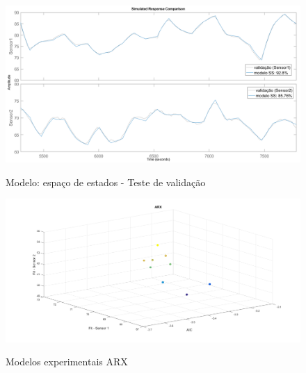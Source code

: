 \begin{apendicesenv}
\begin{figure}
	\caption{Modelo: espaço de estados - Teste de validação}
	\begin{center}
		\includegraphics[width=1.00\textwidth]{./5_images/tclabsp-models-SS-compare.png} 
		\label{fig:tclabsp-models-ss-compare}
	\end{center}
	\centering
\end{figure}

\begin{figure}[h]
	\caption{Modelos experimentais ARX}
	\begin{center}
		\includegraphics[width=1.00\textwidth]{./5_images/tclabsp-models-ARX.png} 
		\label{fig:tclabsp-models-arx}
	\end{center}
	\centering
\end{figure}


\end{apendicesenv}
